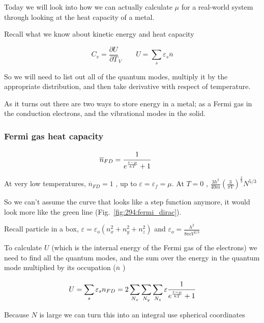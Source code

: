 \documentclass[10pt]{article}
\begin{document}
Today we will look into how we can actually calculate $ \mu $ for a real-world system through looking at the heat capacity of a metal.

Recall what we know about kinetic energy and heat capacity

\begin{equation}
	C_v = \frac{\partial U}{\partial T} _{V} \qquad U = \sum_s \varepsilon_s \overline{n}
\end{equation}

So we will need to list out all of the quantum modes, multiply it by the appropriate distribution, and then take derivative with respect of temperature.

As it turns out there are two ways to store energy in a metal; as a Fermi gas in the conduction electrons, and the vibrational modes in the solid.

\subsubsection{Fermi gas heat capacity}

\begin{equation}
	\overline{n}_{FD} = \cfrac{1}{e^{\frac{\varepsilon - \mu}{kT}} + 1} \qquad
\end{equation}

At very low temperatures, $ \overline{n}_{FD} = 1$ , up to $ \varepsilon = \varepsilon_f = \mu$. At $ T = 0 $ , $\frac{3h^2}{40m} (\frac{3}{\pi V})^{\frac{2}{3}} N^{5 /3} $

So we can't assume the curve that looks like a step function anymore, it would look more like the green line (Fig.~\ref{fig:294:fermi_dirac}).


Recall particle in a box, $ \varepsilon = \varepsilon_o (n_x^2 + n_y^2 + n_z ^2 ) $  and $ \varepsilon_o = \frac{h^2}{8mV^{2 /3}}$ 

To calculate $ U $ (which is the internal energy of the Fermi gas of the electrons) we need to find all the quantum modes, and the sum over the energy in the quantum mode multiplied by its occupation ($ \overline{n} $ )

\begin{equation}
	U = \sum_s \varepsilon_s n_{FD} = 
	2 \sum_{N_x} \sum_{N_y} \sum_{N_z} \varepsilon \cfrac{1}{e^{\frac{\varepsilon - \mu}{kT}} + 1}
\end{equation}


Because $ N $ is large we can turn this into an integral  use spherical coordinates
\end{document}
